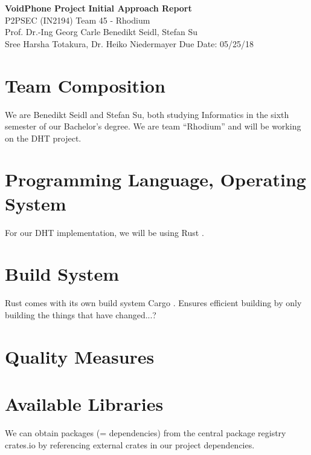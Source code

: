 \documentclass[a4paper, 11pt]{article}
\begin{document}
\noindent
\large\textbf{VoidPhone Project} \hfill \textbf{Initial Approach Report} \\
\normalsize P2PSEC (IN2194)  \hfill Team 45 - Rhodium\\
Prof. Dr.-Ing Georg Carle \hfill Benedikt Seidl, Stefan Su \\
Sree Harsha Totakura, Dr. Heiko Niedermayer \hfill Due Date: 05/25/18

\section*{Team Composition}
We are Benedikt Seidl and Stefan Su, both studying Informatics in the sixth semester of our Bachelor's degree. We are team ``Rhodium'' and will be working on the DHT project.

\section*{Programming Language, Operating System}
For our DHT implementation, we will be using Rust \cite{Rust}. 

\section*{Build System}
Rust comes with its own build system Cargo \cite{Cargo} . Ensures efficient building by only building the things that have changed...? 

\section*{Quality Measures}
\lipsum[4]

\section*{Available Libraries}
We can obtain packages (= dependencies) from the central package registry crates.io \cite{Cargo} by referencing external crates in our project dependencies.
\end{document}
